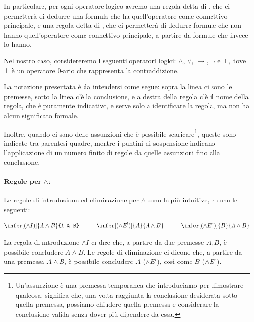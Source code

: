 In particolare, per ogni operatore logico avremo una regola detta di , che ci permetterà di dedurre una formula che ha quell'operatore come connettivo principale, e una regola detta di , che ci permetterà di dedurre formule che non hanno quell'operatore come connettivo principale, a partire da formule che invece lo hanno.

Nel nostro caso, considereremo i seguenti operatori logici: \(\land\), \(\lor\), \(\to\), \(\neg\) e \(\bot\), dove \(\bot\) è un operatore \(0\)-ario che rappresenta la contraddizione.

\begin{note}{}
  La notazione presentata è da intendersi come segue: sopra la linea ci sono le premesse, sotto la linea c'è la conclusione, e a destra della regola c'è il nome della regola, che è puramente indicativo, e serve solo a identificare la regola, ma non ha alcun significato formale.

  Inoltre, quando ci sono delle assunzioni che è possibile scaricare\footnote{Un'assunzione è una premessa temporanea che introduciamo per dimostrare qualcosa.  significa che, una volta raggiunta la conclusione desiderata sotto quella premessa, possiamo chiudere quella premessa e considerare la conclusione valida senza dover più dipendere da essa.}, queste sono indicate tra parentesi quadre, mentre i puntini di sospensione indicano l'applicazione di un numero finito di regole da quelle assunzioni fino alla conclusione.
\end{note}

\paragraph{Regole per \(\land\):}

Le regole di introduzione ed eliminazione per \(\land\) sono le più intuitive, e sono le seguenti:

\begin{equation*}
  \infer[(\land I)]{A \land B}{A & B} \quad\quad\quad \infer[(\land E^l)]{A}{A \land B} \quad\quad\quad \infer[(\land E^r)]{B}{A \land B}
\end{equation*}

La regola di introduzione \(\land I\) ci dice che, a partire da due premesse \(A,B\), è possibile concludere \(A\land B\).
Le regole di eliminazione ci dicono che, a partire da una premessa \(A\land B\), è possibile concludere \(A\) (\(\land E^l\)), così come \(B\) (\(\land E^r\)). 

